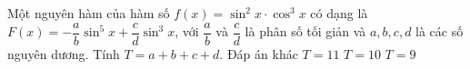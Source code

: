 \begin{ex}%
	Một nguyên hàm của hàm số $f(x)=\sin ^2x\cdot \cos ^3x$ có dạng là $F(x)=-\dfrac{a}{b}\sin ^5x+\dfrac{c}{d}\sin ^3x$, với $\dfrac{a}{b}$ và $\dfrac{c}{d}$ là phân số tối giản và $a,b,c,d$ là các số nguyên dương. Tính $T=a+b+c+d$.
	\choice
	{Đáp án khác}
	{$T=11$}
	{\True $T=10$}
	{$T=9$}
\end{ex}


